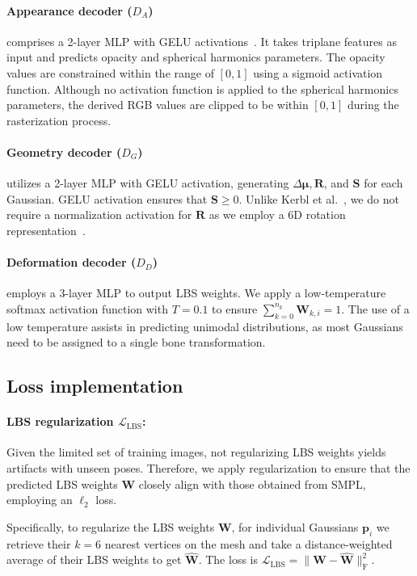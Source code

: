 \paragraph{Appearance decoder ($D_A$)} comprises a 2-layer MLP with GELU activations~\cite{hendrycks2016gelu}. It takes triplane features as input and predicts opacity and spherical harmonics parameters. The opacity values are constrained within the range of $[0, 1]$ using a sigmoid activation function. Although no activation function is applied to the spherical harmonics parameters, the derived RGB values are clipped to be within $[0, 1]$ during the rasterization process.

\paragraph{Geometry decoder ($D_G$)} utilizes a 2-layer MLP with GELU activation, generating $\Delta \bm{\mu}, \bm{R}$, and $\bm{S}$ for each Gaussian. GELU activation ensures that $\bm{S} \ge 0$. Unlike Kerbl et al.~\cite{kerbl3Dgaussians}, we do not require a normalization activation for $\bm{R}$ as we employ a 6D rotation representation~\cite{Zhou_2019}.

\paragraph{Deformation decoder ($D_D$)} employs a 3-layer MLP to output LBS weights. We apply a low-temperature softmax activation function with $T=0.1$ to ensure $\sum_{k=0}^{n_k} \bm{W}_{k,i} = 1$. The use of a low temperature assists in predicting unimodal distributions, as most Gaussians need to be assigned to a single bone transformation.

\subsection{Loss implementation}
\paragraph{LBS regularization $\mathcal{L}_{\text{LBS}}$:} Given the limited set of training images, not regularizing LBS weights yields artifacts with unseen poses. Therefore, we apply regularization to ensure that the predicted LBS weights $\bm{W}$ closely align with those obtained from SMPL, employing an $\ell_2$ loss.

Specifically, to regularize the LBS weights $\bm{W}$, for individual Gaussians $\bm{p}_i$ we retrieve their $k=6$ nearest vertices on the \smpl mesh and take a distance-weighted average of their LBS weights to get $\hat{\bm{W}}$. The loss is $\mathcal{L}_{\text{LBS}} = \| \bm{W} - \hat{\bm{W}} \|_{\text{F}}^2$.

